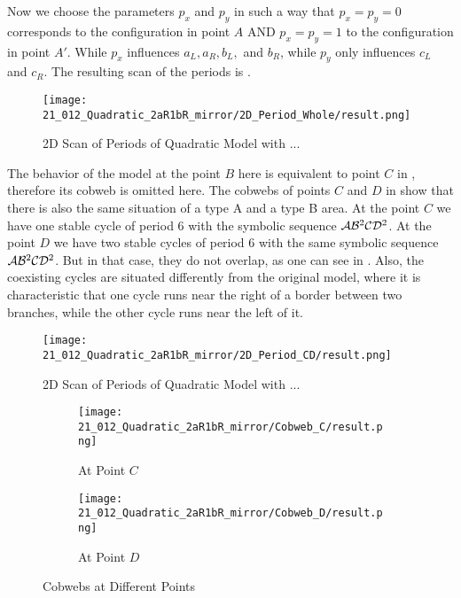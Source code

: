 Now we choose the parameters $p_x$ and $p_y$ in such a way that $p_x = p_y = 0$ corresponds to the configuration in point $A$ AND $p_x = p_y = 1$ to the configuration in point $A'$.
While $p_x$ influences $a_L, a_R, b_L,$ and $b_R$, while $p_y$ only influences $c_L$ and $c_R$.
The resulting scan of the periods is .

\begin{figure}
	\centering
	\texttt{[image: 21\_012\_Quadratic\_2aR1bR\_mirror/2D\_Period\_Whole/result.png]}
	\caption{2D Scan of Periods of Quadratic Model with ...}
	\label{fig:quadratic.full.2aR1bR_mirr.1.2d.whole}
\end{figure}

The behavior of the model at the point $B$ here is equivalent to point $C$ in , therefore its cobweb is omitted here.
The cobwebs of points $C$ and $D$ in  show that there is also the same situation of a type A and a type B area.
At the point $C$ we have one stable cycle of period 6 with the symbolic sequence $\mathcal{A}\mathcal{B}^2\mathcal{C}\mathcal{D}^2$.
At the point $D$ we have two stable cycles of period 6 with the same symbolic sequence $\mathcal{A}\mathcal{B}^2\mathcal{C}\mathcal{D}^2$.
But in that case, they do not overlap, as one can see in .
Also, the coexisting cycles are situated differently from the original model, where it is characteristic that one cycle runs near the right of a border between two branches, while the other cycle runs near the left of it.

\begin{figure}
	\centering
	\texttt{[image: 21\_012\_Quadratic\_2aR1bR\_mirror/2D\_Period\_CD/result.png]}
	\caption{2D Scan of Periods of Quadratic Model with ...}
	\label{fig:quadratic.full.2aR1bR_mirr.1.2d.CD}
\end{figure}

\begin{figure}
	\centering
	\begin{subfigure}{0.4\textwidth}
		\centering
		\texttt{[image: 21\_012\_Quadratic\_2aR1bR\_mirror/Cobweb\_C/result.png]}
		\caption{At Point $C$}
		\label{fig:quad.full.2aR1bR_cL_mirr.1.CobwebC}
	\end{subfigure}
	\begin{subfigure}{0.4\textwidth}
		\centering
		\texttt{[image: 21\_012\_Quadratic\_2aR1bR\_mirror/Cobweb\_D/result.png]}
		\caption{At Point $D$}
		\label{fig:quad.full.2aR1bR_cL_mirr.1.CobwebD}
	\end{subfigure}
	\caption{Cobwebs at Different Points}
	\label{fig:quad.full.2aR1bR_cL_mirr.1.CobwebsCD}
\end{figure}

